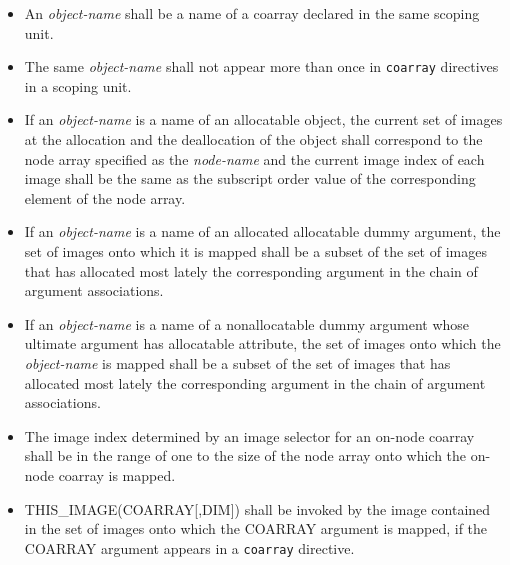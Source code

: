 \begin{itemize}
 \item An {\it object-name} shall be a name of a coarray declared 
       in the same scoping unit.

 \item The same {\it object-name} shall not appear more than once
       in {\tt coarray} directives in a scoping unit.

 \item If an {\it object-name} is a name of an allocatable object,
       the current set of images
       at the allocation and the deallocation of the
       object shall correspond to the node array specified as the {\it
       node-name} and the current image index of each image shall 
       be the same as the subscript order value of the corresponding
       element of the node array.

 \item If an {\it object-name} is a name of an allocated allocatable
       dummy argument,
       the set of images onto which it is mapped
       shall be a subset of the set of images that has allocated most lately 
       the corresponding argument in the chain of argument associations.
       
 \item If an {\it object-name} is a name of a nonallocatable dummy argument
       whose ultimate argument has allocatable attribute,
       the set of images onto which the {\it object-name} is mapped
       shall be a subset of the set of images that has allocated most lately 
       the corresponding argument in the chain of argument associations.

 \item The image index determined by an image selector for an on-node
       coarray shall be in the range of one to the size of the node
       array onto which the on-node coarray is mapped.

 \item 
THIS\_IMAGE(COARRAY[,DIM]) shall be invoked by
the image contained in the set of images onto which
the COARRAY argument is mapped,
if the COARRAY argument appears in a {\tt coarray} directive.


\end{itemize}

